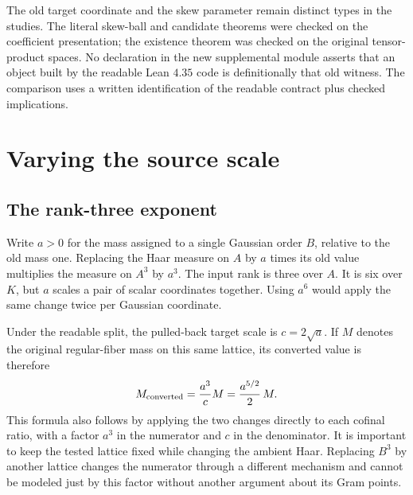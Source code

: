 \documentclass[12pt,letterpaper]{article}
\begin{document}
The old target coordinate and the skew parameter remain distinct types in the studies. The literal skew-ball and candidate theorems were checked on the coefficient presentation; the existence theorem was checked on the original tensor-product spaces. No declaration in the new supplemental module asserts that an object built by the readable Lean $4.35$ code is definitionally that old witness. The comparison uses a written identification of the readable contract plus checked implications.

\section{Varying the source scale}
\subsection{The rank-three exponent}
Write $a>0$ for the mass assigned to a single Gaussian order $B$, relative to the old mass one. Replacing the Haar measure on $A$ by $a$ times its old value multiplies the measure on $A^3$ by $a^3$. The input rank is three over $A$. It is six over $K$, but $a$ scales a pair of scalar coordinates together. Using $a^6$ would apply the same change twice per Gaussian coordinate.

Under the readable split, the pulled-back target scale is $c=2\sqrt a$. If $M$ denotes the original regular-fiber mass on this same lattice, its converted value is therefore
\[
   M_{\rm converted}= \frac{a^3}{c} M
                =\frac{a^{5/2}}{2}\,M.
\]
This formula also follows by applying the two changes directly to each cofinal ratio, with a factor $a^3$ in the numerator and $c$ in the denominator. It is important to keep the tested lattice fixed while changing the ambient Haar. Replacing $B^3$ by another lattice changes the numerator through a different mechanism and cannot be modeled just by this factor without another argument about its Gram points.
\end{document}
